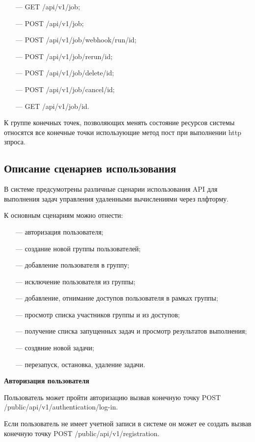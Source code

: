 \begin{itemize}
  \item[---]GET /api/v1/job;
  \item[---]POST /api/v1/job;
  \item[---]POST /api/v1/job/webhook/run/{id};
  \item[---]POST /api/v1/job/rerun/{id};
  \item[---]POST /api/v1/job/delete/{id};
  \item[---]POST /api/v1/job/cancel/{id};
  \item[---]GET /api/v1/job/{id}.
\end{itemize}

К группе конечных точек, позволяющих менять состояние ресурсов системы относятся все конечные точки использующие метод пост при выполнении http зпроса.

\subsection{Описание сценариев использования}

В системе предсумотрены различные сценарии использования API для выполнения задач управления удаленными вычислениями через плфторму.

К основным сценариям можно отнести:

\begin{itemize}
  \item[---]авторизация пользователя;
  \item[---]создание новой группы пользователей;
  \item[---]добавление пользователя в группу;
  \item[---]исключение пользователя из группы;
  \item[---]добавление, отнимание доступов пользователя в рамках группы;
  \item[---]просмотр списка участников группы и из доступов;
  \item[---]получение списка запущенных задач и просмотр результатов выполнения;
  \item[---]создвние новой задачи;
  \item[---]перезапуск, остановка, удаление задачи.
\end{itemize}

{\bf Авторизация пользователя }

Пользователь может пройти авторизацию вызвав конечную точку POST /public/api/v1/authentication/log-in.

Если пользователь не имеет учетной записи в системе он может ее создать вызвав конечную точку POST /public/api/v1/registration.

